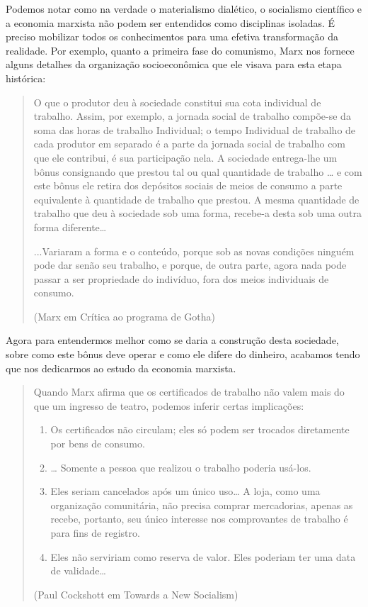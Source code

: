 Podemos notar como na verdade o materialismo dialético, o socialismo científico e a economia marxista não podem ser entendidos como disciplinas isoladas. É preciso mobilizar todos os conhecimentos para uma efetiva transformação da realidade. Por exemplo, quanto a primeira fase do comunismo, Marx nos fornece alguns detalhes da organização socioeconômica que ele visava para esta etapa histórica:

\begin{quote}
O que o produtor deu à sociedade constitui sua cota individual de trabalho. Assim, por exemplo, a jornada social de trabalho compõe-se da soma das horas de trabalho Individual; o tempo Individual de trabalho de cada produtor em separado é a parte da jornada social de trabalho com que ele contribui, é sua participação nela. A sociedade entrega-lhe um bônus consignando que prestou tal ou qual quantidade de trabalho … e com este bônus ele retira dos depósitos sociais de meios de consumo a parte equivalente à quantidade de trabalho que prestou. A mesma quantidade de trabalho que deu à sociedade sob uma forma, recebe-a desta sob uma outra forma diferente…

...Variaram a forma e o conteúdo, porque sob as novas condições ninguém pode dar senão seu trabalho, e porque, de outra parte, agora nada pode passar a ser propriedade do indivíduo, fora dos meios individuais de consumo.

(Marx em Crítica ao programa de Gotha)
\end{quote}

Agora para entendermos melhor como se daria a construção desta sociedade, sobre como este bônus deve operar e como ele difere do dinheiro, acabamos tendo que nos dedicarmos ao estudo da economia marxista.

\begin{quote}
Quando Marx afirma que os certificados de trabalho não valem mais do que um ingresso de teatro, podemos inferir certas implicações:
\begin{enumerate}
\item Os certificados não circulam; eles só podem ser trocados diretamente por bens de consumo.

\item  … Somente a pessoa que realizou o trabalho poderia usá-los.

\item Eles seriam cancelados após um único uso… A loja, como uma organização comunitária, não precisa comprar mercadorias, apenas as recebe, portanto, seu único interesse nos comprovantes de trabalho é para fins de registro.

\item Eles não serviriam como reserva de valor. Eles poderiam ter uma data de validade…
\end{enumerate}
(Paul Cockshott em Towards a New Socialism)
\end{quote}

